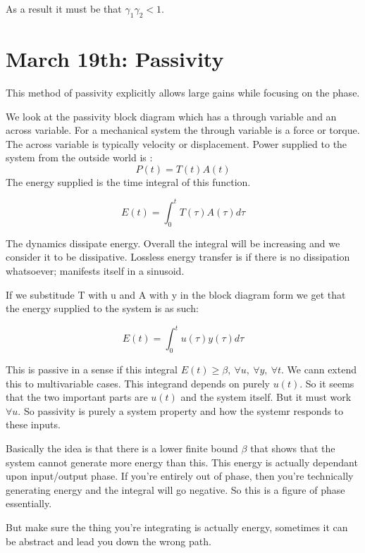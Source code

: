 \documentclass[11pt]{article}
\begin{document}
As a result it must be that $\gamma_1 \gamma_2 < 1$.






\section*{March 19th: Passivity}
This method of passivity explicitly allows large gains while focusing on the phase.

We look at the passivity block diagram which has a through variable and an across variable.  For a mechanical system the through variable is a force or torque. The across variable is typically velocity or displacement. Power supplied to the system from the outside world is :
\begin{equation}
P(t) = T(t)A(t)
\end{equation}
The energy supplied is the time integral of this function.

\begin{equation}
E(t) = \int_0^t T(\tau)A(\tau) d\tau
\end{equation}

The dynamics dissipate energy. Overall the integral will be increasing and we consider it to be dissipative. Lossless energy transfer is if there is no dissipation whatsoever; manifests itself in a sinusoid.

If we substitude T with u and A with y in the block diagram form we get that the energy supplied to the system is as such:
 
 \begin{equation}
E(t) = \int_0^t u(\tau)y(\tau) d\tau
\end{equation}

This is passive in a sense if this integral $E(t) \geq \beta, \ \forall u, \ \forall y, \ \forall t$. We cann extend this to multivariable cases. This integrand depends on purely $u(t)$. So it seems that the two important parts are $u(t)$ and the system itself. But it must work $\forall u$. So passivity is purely a system property and how the systemr responds to these inputs.

Basically the idea is that there is a lower finite bound $\beta$ that shows that the system cannot generate more energy than this. This energy is actually dependant upon input/output phase. If you're entirely out of phase, then you're technically generating energy and the integral will go negative. So this is a figure of phase essentially.

But make sure the thing you're integrating is actually energy, sometimes it can be abstract and lead you down the wrong path.
 
\end{document}
